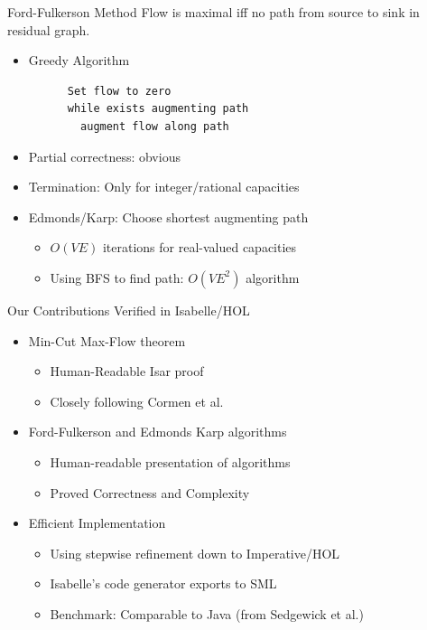 \documentclass[fleqn]{beamer}
\begin{document}
\begin{frame}[fragile]{Ford-Fulkerson Method}
  {}
  {\small{Flow is maximal iff no path from source to sink in residual graph.}}
  \vfill

  \begin{itemize}
   \item Greedy Algorithm
    \begin{lstlisting}
      Set flow to zero
      while exists augmenting path
        augment flow along path
    \end{lstlisting}%
   \item Partial correctness: obvious
   \item Termination: Only for integer/rational capacities
   \item Edmonds/Karp: Choose shortest augmenting path
    \begin{itemize}
     \item $O(VE)$ iterations for real-valued capacities
     \item Using BFS to find path: $O(VE^2)$ algorithm

    \end{itemize}
  \end{itemize}
\end{frame}
\begin{frame}{Our Contributions}
  {Verified in Isabelle/HOL}

  \begin{itemize}
   \item Min-Cut Max-Flow theorem
    \begin{itemize}
     \item Human-Readable Isar proof
     \item Closely following Cormen et al.
    \end{itemize}
   \item Ford-Fulkerson and Edmonds Karp algorithms
    \begin{itemize}
     \item Human-readable presentation of algorithms
     \item Proved Correctness and Complexity
    \end{itemize}
   \item Efficient Implementation
    \begin{itemize}
     \item Using stepwise refinement down to Imperative/HOL
     \item Isabelle's code generator exports to SML
     \item Benchmark: Comparable to Java (from Sedgewick et al.)

    \end{itemize}
  \end{itemize}
\end{frame}
\newcommand{\augment}{{\mathbin\uparrow}}%
\end{document}
